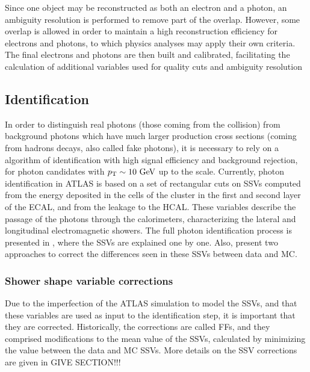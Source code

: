 Since one object may be reconstructed as both an electron and a photon, an ambiguity resolution is performed to remove part of the overlap. However, some overlap is allowed in order to maintain a high reconstruction efficiency for electrons and photons, to which physics analyses may apply their own criteria. The final electrons and photons are then built and calibrated, facilitating the calculation of additional variables used for quality cuts and ambiguity resolution



\subsection{Identification}
\label{subsec:objects:egamma:id}

In order to distinguish real photons (those coming from the collision) from background photons which have much larger production cross sections (coming from hadrons decays, also called fake photons), it is necessary to rely on a algorithm of identification with high signal efficiency and background rejection, for photon candidates with \(p_{\text{T}} \sim 10~\text{GeV}\) up to the \tev scale. 
Currently, photon identification in ATLAS is based on a set of rectangular cuts on \acp{SSV} computed from the energy deposited in the cells of the cluster in the first and second layer of the \ac{ECAL}, and from the leakage to the \ac{HCAL}. These variables describe the passage of the photons through the calorimeters, characterizing the lateral and longitudinal electromagnetic showers.
The full photon identification process is presented in \Ch{\ref{ch:pid_ss}}, where the \acp{SSV} are explained one by one. Also, \Ch{\ref{ch:ss_corrections}} present two approaches to correct the differences seen in these \acp{SSV} between data and \ac{MC}.



\subsubsection{Shower shape variable corrections}

Due to the imperfection of the \ac{ATLAS} simulation to model the \acp{SSV}, and that these variables are used as input to the identification step, it is important that they are corrected. Historically, the corrections are called \acp{FF}, and they comprised modifications to the mean value of the \acp{SSV}, calculated by minimizing the \chisq value between the data and \ac{MC} \acp{SSV}.
More details on the \ac{SSV} corrections are given in GIVE SECTION!!!

